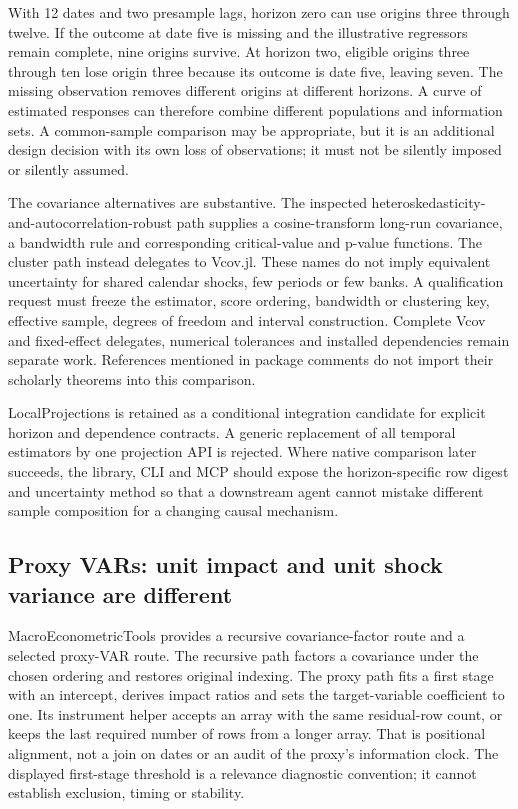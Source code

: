 With 12 dates and two presample lags, horizon zero can use origins three through twelve. If the outcome at date five is missing and the illustrative regressors remain complete, nine origins survive. At horizon two, eligible origins three through ten lose origin three because its outcome is date five, leaving seven. The missing observation removes different origins at different horizons. A curve of estimated responses can therefore combine different populations and information sets. A common-sample comparison may be appropriate, but it is an additional design decision with its own loss of observations; it must not be silently imposed or silently assumed.~\citep{exec25_odyn_lp,exec25_odyn_choice}

The covariance alternatives are substantive. The inspected heteroskedasticity-and-autocorrelation-robust path supplies a cosine-transform long-run covariance, a bandwidth rule and corresponding critical-value and p-value functions. The cluster path instead delegates to Vcov.jl. These names do not imply equivalent uncertainty for shared calendar shocks, few periods or few banks. A qualification request must freeze the estimator, score ordering, bandwidth or clustering key, effective sample, degrees of freedom and interval construction. Complete Vcov and fixed-effect delegates, numerical tolerances and installed dependencies remain separate work. References mentioned in package comments do not import their scholarly theorems into this comparison.

LocalProjections is retained as a conditional integration candidate for explicit horizon and dependence contracts. A generic replacement of all temporal estimators by one projection API is rejected. Where native comparison later succeeds, the library, CLI and MCP should expose the horizon-specific row digest and uncertainty method so that a downstream agent cannot mistake different sample composition for a changing causal mechanism.~\citep{exec25_odyn_lp,exec25_odyn_choice}

\subsection{Proxy VARs: unit impact and unit shock variance are different}

MacroEconometricTools provides a recursive covariance-factor route and a selected proxy-VAR route. The recursive path factors a covariance under the chosen ordering and restores original indexing. The proxy path fits a first stage with an intercept, derives impact ratios and sets the target-variable coefficient to one. Its instrument helper accepts an array with the same residual-row count, or keeps the last required number of rows from a longer array. That is positional alignment, not a join on dates or an audit of the proxy's information clock. The displayed first-stage threshold is a relevance diagnostic convention; it cannot establish exclusion, timing or stability.~\citep{exec25_odyn_macro}

